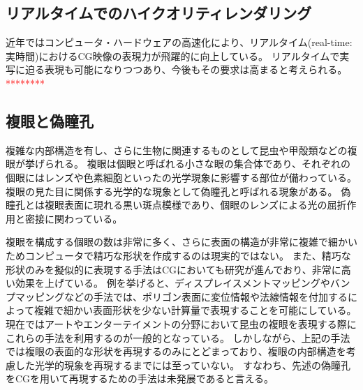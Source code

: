 
\subsection{リアルタイムでのハイクオリティレンダリング}

近年ではコンピュータ・ハードウェアの高速化により、リアルタイム(real-time:実時間)におけるCG映像の表現力が飛躍的に向上している。
リアルタイムで実写に迫る表現も可能になりつつあり、今後もその要求は高まると考えられる。
\textcolor{red}{********}

\subsection{複眼と偽瞳孔}
\label{SSCompoundeyeandpseudopupil}

複雑な内部構造を有し、さらに生物に関連するものとして昆虫や甲殻類などの複眼が挙げられる。
複眼は個眼と呼ばれる小さな眼の集合体であり、それぞれの個眼にはレンズや色素細胞といったの光学現象に影響する部位が備わっている。
複眼の見た目に関係する光学的な現象として偽瞳孔と呼ばれる現象がある。
偽瞳孔とは複眼表面に現れる黒い斑点模様であり、個眼のレンズによる光の屈折作用と密接に関わっている。

複眼を構成する個眼の数は非常に多く、さらに表面の構造が非常に複雑で細かいためコンピュータで精巧な形状を作成するのは現実的ではない。
また、精巧な形状のみを擬似的に表現する手法はCGにおいても研究が進んでおり、非常に高い効果を上げている。
例を挙げると、ディスプレイスメントマッピングやバンプマッピングなどの手法では、ポリゴン表面に変位情報や法線情報を付加するによって複雑で細かい表面形状を少ない計算量で表現することを可能にしている\figref{}\figref{}。
現在ではアートやエンターテイメントの分野において昆虫の複眼を表現する際にこれらの手法を利用するのが一般的となっている\figref{}。
しかしながら、上記の手法では複眼の表面的な形状を再現するのみにとどまっており、複眼の内部構造を考慮した光学的現象を再現するまでには至っていない。
すなわち、先述の偽瞳孔をCGを用いて再現するための手法は未発展であると言える。


